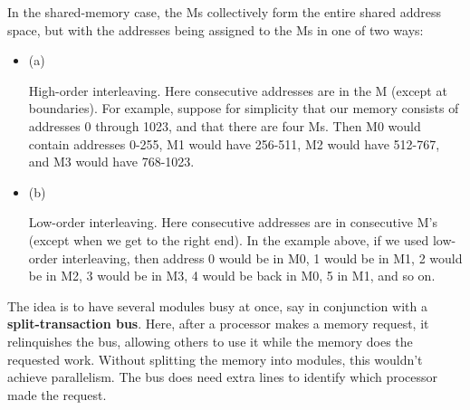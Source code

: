 In the shared-memory case, the Ms collectively form the entire
shared address space, but with the addresses being assigned to the Ms in
one of two ways:

\begin{itemize}

\item (a)

High-order interleaving. Here consecutive addresses are in the
 M (except at boundaries). For example, suppose for
simplicity that our memory consists of addresses 0 through 1023, and
that there are four Ms.  Then M0 would contain addresses 0-255, M1 would
have 256-511, M2 would have 512-767, and M3 would have 768-1023.

\item (b)

Low-order interleaving. Here consecutive addresses are in consecutive
M's (except when we get to the right end). In the example above, if we
used low-order interleaving, then address 0 would be in M0, 1 would be
in M1, 2 would be in M2, 3 would be in M3, 4 would be back in M0, 5 in
M1, and so on.

\end{itemize}

The idea is to have several modules busy at once, say in conjunction
with a {\bf split-transaction bus}.  Here, after a processor makes a
memory request, it relinquishes the bus, allowing others to use it while
the memory does the requested work.  Without splitting the memory into
modules, this wouldn't achieve parallelism.  The bus does need extra
lines to identify which processor made the request.

% 
% 
% 
% 
% 


